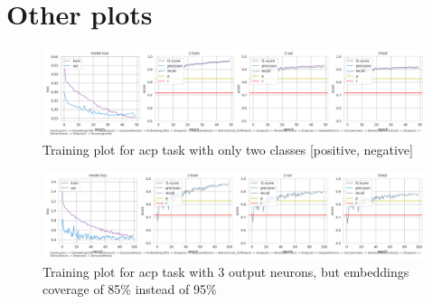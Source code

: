 \documentclass{article}
\begin{document}
    \section{Other plots}\label{sec:s7}
            \begin{figure}
                \includegraphics[width=\linewidth]{../experiments/acp/no_onehot.png}
                \caption{Training plot for acp task with only two classes [positive, negative]}
                \label{fig:train-acd-no-onehot}
            \end{figure}
                \begin{figure}
                \includegraphics[width=\linewidth]{../experiments/acp/without_preprocessing.png}
                \caption{Training plot for acp task with 3 output neurons, but embeddings coverage of 85\% instead of 95\%}
                \label{fig:train-acd-no-preprocessing}
            \end{figure}
\end{document}

